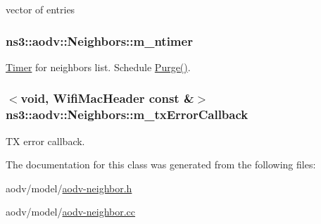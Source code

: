 vector of entries 

\subsubsection[{\texorpdfstring{m\+\_\+ntimer}{m_ntimer}}]{ ns3\+::aodv\+::\+Neighbors\+::m\+\_\+ntimer\hspace{0.3cm}{\ttfamily [private]}}\hypertarget{classns3_1_1aodv_1_1Neighbors_a94dd235d692b8ff312b51654580530cd}{}\label{classns3_1_1aodv_1_1Neighbors_a94dd235d692b8ff312b51654580530cd}


\hyperlink{classns3_1_1Timer}{Timer} for neighbor\textquotesingle{}s list. Schedule \hyperlink{classns3_1_1aodv_1_1Neighbors_a5db1238b20a700967e21ebb3522afc5c}{Purge()}. 

\subsubsection[{\texorpdfstring{m\+\_\+tx\+Error\+Callback}{m_txErrorCallback}}]{$<$void, {\bf Wifi\+Mac\+Header} const \&$>$ ns3\+::aodv\+::\+Neighbors\+::m\+\_\+tx\+Error\+Callback\hspace{0.3cm}{\ttfamily [private]}}\hypertarget{classns3_1_1aodv_1_1Neighbors_ab0ff33bad83facfa8a2da7d932bd9953}{}\label{classns3_1_1aodv_1_1Neighbors_ab0ff33bad83facfa8a2da7d932bd9953}


TX error callback. 



The documentation for this class was generated from the following files\+:\begin{DoxyCompactItemize}
\item 
aodv/model/\hyperlink{aodv-neighbor_8h}{aodv-\/neighbor.\+h}\item 
aodv/model/\hyperlink{aodv-neighbor_8cc}{aodv-\/neighbor.\+cc}\end{DoxyCompactItemize}
